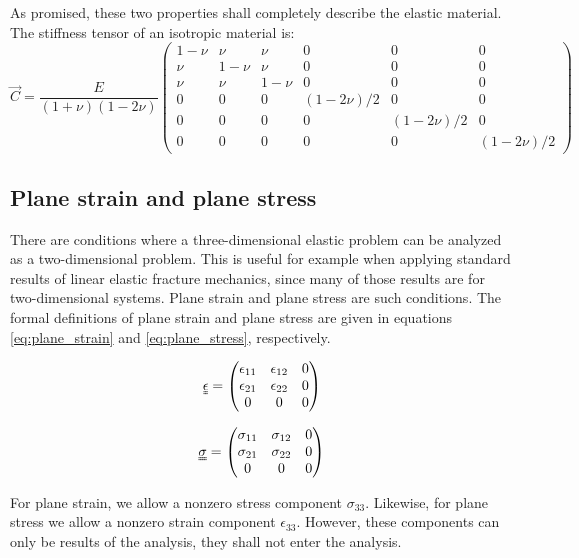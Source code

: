 As promised, these two properties shall completely describe the elastic material. The stiffness tensor of an isotropic material is:
\begin{equation}
	\vec{C} = 
   	\frac{E}{(1+\nu)(1-2\nu)}
   	\begin{pmatrix}
		1-\nu & \nu & \nu & 0 & 0 & 0 \\
		\nu & 1-\nu & \nu & 0 & 0 & 0 \\
		   \nu & \nu & 1-\nu & 0 & 0 & 0 \\
		   0 & 0 & 0 & (1-2\nu)/2 & 0 & 0 \\
		   0 & 0 & 0 & 0 & (1-2\nu)/2 & 0 \\
		   0 & 0 & 0 & 0 & 0 & (1-2\nu)/2
	\end{pmatrix}
\end{equation}

\subsection{Plane strain and plane stress}
There are conditions where a three-dimensional elastic problem can be analyzed as a two-dimensional problem. This is useful for example when applying standard results of linear elastic fracture mechanics, since many of those results are for two-dimensional systems. Plane strain and plane stress are such conditions. The formal definitions of plane strain and plane stress are given in equations \ref{eq:plane_strain} and \ref{eq:plane_stress}, respectively.

\begin{equation}
\uuline \epsilon = 
\begin{pmatrix}
	\epsilon_{11} & \epsilon_{12} & 0 \\
	\epsilon_{21} & \epsilon_{22} & 0 \\
	0 & 0 & 0
\end{pmatrix}
\label{eq:plane_strain}
\end{equation}

\begin{equation}
\uuline \sigma = 
\begin{pmatrix}
	\sigma_{11} & \sigma_{12} & 0 \\
	\sigma_{21} & \sigma_{22} & 0 \\
	0 & 0 & 0
\end{pmatrix}
\label{eq:plane_stress}
\end{equation}

For plane strain, we allow a nonzero stress component $\sigma_{33}$. Likewise, for plane stress we allow a nonzero strain component $\epsilon_{33}$. However, these components can only be results of the analysis, they shall not enter the analysis. 


